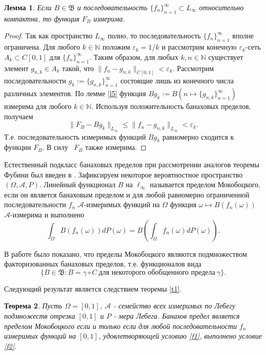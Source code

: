 \documentclass[12pt]{article}
\newtheorem{thm}{Теорема}
\newtheorem{lem}[thm]{Лемма}
\def\N{{\mathbb{N}}}
\def\B{{\mathfrak{B}}}
\begin{document}
\begin{lem}\label{l6}
Если $B\in \B$ и последовательность $\{f_n\}_{n=1}^\infty \subset L_\infty$  относительно компактна, то функция $F_B$ измерима.
\end{lem}

\begin{proof}
Так как пространство $L_\infty$ полно, то последовательность $\{f_n\}_{n=1}^\infty$ вполне ограничена. Для любого $k\in\N$ положим $\varepsilon_k=1/k$ и рассмотрим конечную $\varepsilon_k$-сеть $A_k\subset C[0,1]$ для $\{f_n\}_{n=1}^\infty$. Таким образом, для любых $k, n\in\N$ существует элемент $g_{n,k}\in A_k$ такой, что $\|f_n-g_{n,k}\|_{C[0,1]}<\varepsilon_k.$ Рассмотрим последовательности $g_k:=\{g_{n,k}\}_{n=1}^\infty$ состоящие лишь из конечного числа различных  элементов. По лемме \ref{l5} функция $Bg_k:= B(n\mapsto \{g_{n,k}\}_{n=1}^\infty)$ измерима для любого $k\in \N.$ Используя положительность банаховых пределов, получаем
$$\|F_B-Bg_{k}\|_{L_\infty}\le\|f_n-g_{n,k}\|_{L_\infty}<\varepsilon_k.$$
Т.е. последовательность измеримых функций $Bg_k$ равномерно сходится к функции $F_B$. В силу~\cite{NatansonTF} $F_B$ также измерима.
\end{proof}

Естественный подкласс банаховых пределов при рассмотрении аналогов теоремы Фубини был введен в \cite{Mokobodzki}.
Зафиксируем некоторое вероятностное пространство $(\Omega, \mathcal A, P)$. Линейный функционал $B$ на $\ell_\infty$ называется пределом Мокобоцкого, если он является банаховым пределом и для любой равномерно ограниченной последовательности $f_n$  $\mathcal A$-измеримых функций на $\Omega$ функция $\omega \mapsto B(f_n(\omega))$ $\mathcal A$-измерима и выполнено
\begin{equation}\label{Fubini1}
\int_\Omega B(f_n(\omega)) dP(\omega) = B\left(\int_\Omega f_n(\omega) dP(\omega)\right).
 \end{equation}

 В работе \cite{Bjorklund} было показано, что пределы Мокобоцкого являются подмножеством факторизованных банаховых пределов, т.е. функционалов вида
$$\{ B\in \B : B=\gamma \circ C \ \text{для некоторого обобщенного предела} \ \gamma\}.$$

Следующий результат является следствием теоремы \ref{t1}.

\begin{thm}
Пусть $\Omega=[0,1]$, $\mathcal A$ - семейство всех измеримых по Лебегу подмножеств отрезка $[0,1]$ и $P$ - мера Лебега. Банахов предел является пределом Мокобоцкого если и только если для любой последовательности $f_n$  измеримых функций на $[0,1]$,  удовлетворяющей условию \eqref{f1}, выполнено условие \eqref{f2}.
\end{thm}


\printbibliography
\end{document}
